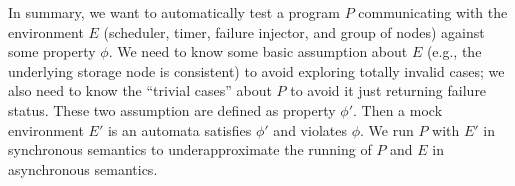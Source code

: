 In summary, we want to automatically test a program $P$ communicating with the environment $E$ (scheduler, timer, failure injector, and group of nodes) against some property $\phi$. We need to know some basic assumption about $E$ (e.g., the underlying storage node is consistent) to avoid exploring totally invalid cases; we also need to know the ``trivial cases'' about $P$ to avoid it just returning failure status. These two assumption are defined as property $\phi'$. Then a mock environment $E'$ is an automata satisfies $\phi'$ and violates $\phi$. We run $P$ with $E'$ in synchronous semantics to underapproximate the running of $P$ and $E$ in asynchronous semantics.